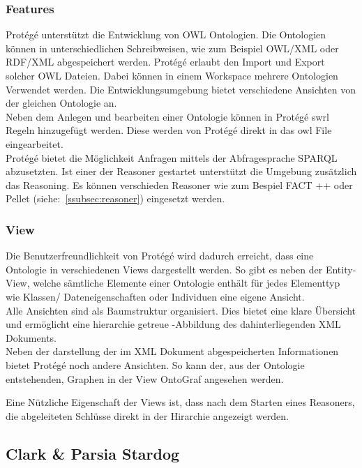 \subsubsection{Features}
\label{subsubsec:protege_features}

Protégé unterstützt die Entwicklung von OWL Ontologien. Die Ontologien können in unterschiedlichen Schreibweisen, wie zum Beispiel OWL/XML oder RDF/XML abgespeichert werden. Protégé erlaubt den Import und Export solcher OWL Dateien. Dabei können in einem Workspace mehrere Ontologien Verwendet werden. Die Entwicklungsumgebung bietet verschiedene Ansichten von der gleichen Ontologie an. \\
Neben dem Anlegen und bearbeiten einer Ontologie können in Protégé  swrl Regeln hinzugefügt werden. Diese werden von Protégé direkt in das owl File eingearbeitet. \\
Protégé bietet die Möglichkeit Anfragen mittels der Abfragesprache SPARQL abzusetzten. Ist einer der Reasoner gestartet unterstützt die Umgebung zusätzlich das Reasoning. Es können verschieden Reasoner wie zum Bespiel FACT ++ oder Pellet (siehe:~\ref{ssubsec:reasoner}) eingesetzt werden.\cite{protegeFeatures} 


\subsubsection{View}
\label{subsubsec:protege_view}

Die Benutzerfreundlichkeit von Protégé wird dadurch erreicht, dass eine Ontologie in verschiedenen Views dargestellt werden. So gibt es neben der Entity-View, welche sämtliche Elemente einer Ontologie enthält für jedes Elementtyp wie Klassen/ Dateneigenschaften oder Individuen eine eigene Ansicht.\\
Alle Ansichten sind als Baumstruktur organisiert. Dies bietet eine klare Übersicht und ermöglicht eine hierarchie getreue -Abbildung des dahinterliegenden XML Dokuments.\\ 
Neben der darstellung der im XML Dokument abgespeicherten Informationen bietet Protégé noch andere Ansichten. So kann der, aus der Ontologie entstehenden, Graphen in der View OntoGraf angesehen werden.\cite{protegeView}

Eine Nützliche Eigenschaft der Views ist, dass nach dem Starten eines Reasoners, die abgeleiteten Schlüsse direkt in der Hirarchie angezeigt werden.

\subsection{Clark \& Parsia Stardog}
\label{subsec:stardog}


